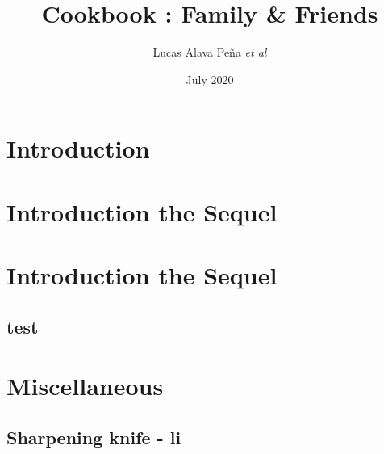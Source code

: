\documentclass[18pt]{book}
\title{Cookbook : Family \& Friends}
\author{Lucas Alava Peña \textit{et al}}
\date{July 2020}
\begin{document}
\frontmatter
\pagestyle{plain}%





\tableofcontents

\mainmatter
\chapter{Introduction}


\chapter{Introduction the Sequel}

\blindtext

\chapter{Introduction the Sequel}

\section{test}

\chapter{Miscellaneous}

\section{Sharpening knife - li}

\backmatter

\printindex
\end{document}
